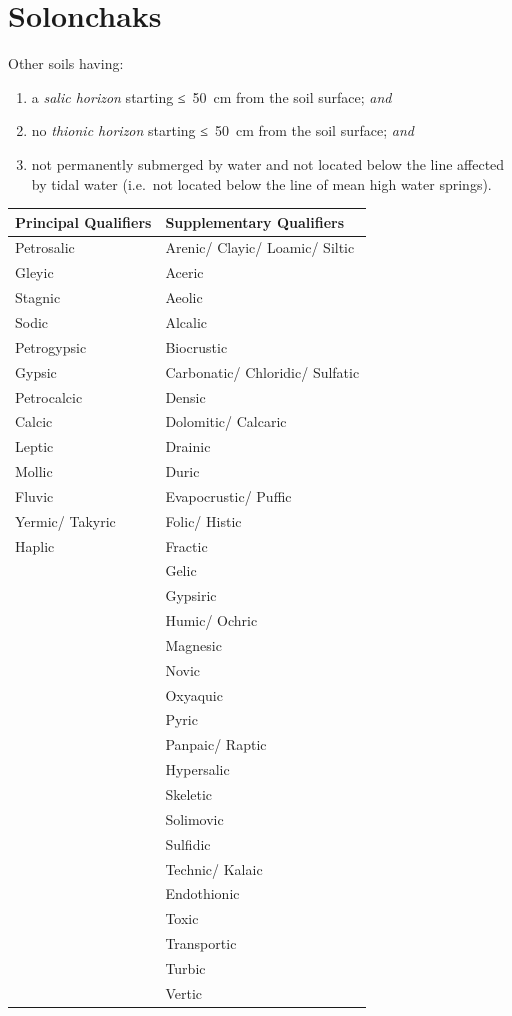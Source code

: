 \documentclass[
  letterpaper,
  DIV=11,
  numbers=noendperiod]{scrreprt}
\providecommand{\tightlist}{%
  \setlength{\itemsep}{0pt}\setlength{\parskip}{0pt}}\usepackage{longtable,booktabs,array}
\begin{document}

\hypertarget{key-solonchaks}{%
\chapter{Solonchaks}\label{key-solonchaks}}

Other soils having:

\begin{enumerate}
\def\labelenumi{\arabic{enumi}.}
\tightlist
\item
  a \emph{salic horizon} starting ≤~50~cm from the soil surface;
  \emph{and}
\item
  no \emph{thionic horizon} starting ≤~50~cm from the soil surface;
  \emph{and}
\item
  not permanently submerged by water and not located below the line
  affected by tidal water (i.e.~not located below the line of mean high
  water springs).
\end{enumerate}

\begin{longtable}[]{@{}ll@{}}
\toprule()
Principal Qualifiers & Supplementary Qualifiers \\
\midrule()
\endhead
Petrosalic & Arenic/ Clayic/ Loamic/ Siltic \\
Gleyic & Aceric \\
Stagnic & Aeolic \\
Sodic & Alcalic \\
Petrogypsic & Biocrustic \\
Gypsic & Carbonatic/ Chloridic/ Sulfatic \\
Petrocalcic & Densic \\
Calcic & Dolomitic/ Calcaric \\
Leptic & Drainic \\
Mollic & Duric \\
Fluvic & Evapocrustic/ Puffic \\
Yermic/ Takyric & Folic/ Histic \\
Haplic & Fractic \\
& Gelic \\
& Gypsiric \\
& Humic/ Ochric \\
& Magnesic \\
& Novic \\
& Oxyaquic \\
& Pyric \\
& Panpaic/ Raptic \\
& Hypersalic \\
& Skeletic \\
& Solimovic \\
& Sulfidic \\
& Technic/ Kalaic \\
& Endothionic \\
& Toxic \\
& Transportic \\
& Turbic \\
& Vertic \\
\bottomrule()
\end{longtable}
\end{document}
